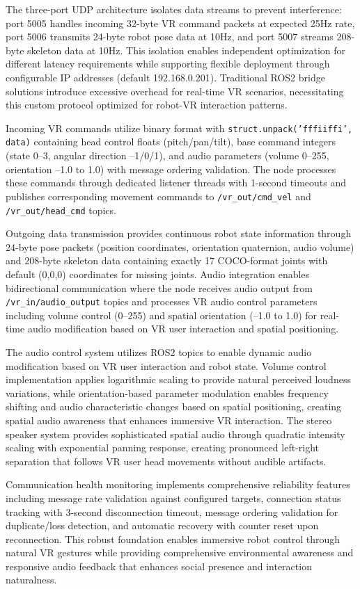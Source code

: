 The three-port UDP architecture isolates data streams to prevent interference: port 5005 handles incoming 32-byte VR command packets at expected 25Hz rate, port 5006 transmits 24-byte robot pose data at 10Hz, and port 5007 streams 208-byte skeleton data at 10Hz. This isolation enables independent optimization for different latency requirements while supporting flexible deployment through configurable IP addresses (default 192.168.0.201). Traditional ROS2 bridge solutions introduce excessive overhead for real-time VR scenarios, necessitating this custom protocol optimized for robot-VR interaction patterns.

Incoming VR commands utilize binary format with \texttt{struct.unpack('fffiiffi', data)} containing head control floats (pitch/pan/tilt), base command integers (state 0--3, angular direction --1/0/1), and audio parameters (volume 0--255, orientation --1.0 to 1.0) with message ordering validation. The node processes these commands through dedicated listener threads with 1-second timeouts and publishes corresponding movement commands to \texttt{/vr\_out/cmd\_vel} and \texttt{/vr\_out/head\_cmd} topics.

Outgoing data transmission provides continuous robot state information through 24-byte pose packets (position coordinates, orientation quaternion, audio volume) and 208-byte skeleton data containing exactly 17 COCO-format joints with default (0,0,0) coordinates for missing joints. Audio integration enables bidirectional communication where the node receives audio output from \texttt{/vr\_in/audio\_output} topics and processes VR audio control parameters including volume control (0--255) and spatial orientation (--1.0 to 1.0) for real-time audio modification based on VR user interaction and spatial positioning.

The audio control system utilizes ROS2 topics to enable dynamic audio modification based on VR user interaction and robot state. Volume control implementation applies logarithmic scaling to provide natural perceived loudness variations, while orientation-based parameter modulation enables frequency shifting and audio characteristic changes based on spatial positioning, creating spatial audio awareness that enhances immersive VR interaction. The stereo speaker system provides sophisticated spatial audio through quadratic intensity scaling with exponential panning response, creating pronounced left-right separation that follows VR user head movements without audible artifacts.

Communication health monitoring implements comprehensive reliability features including message rate validation against configured targets, connection status tracking with 3-second disconnection timeout, message ordering validation for duplicate/loss detection, and automatic recovery with counter reset upon reconnection. This robust foundation enables immersive robot control through natural VR gestures while providing comprehensive environmental awareness and responsive audio feedback that enhances social presence and interaction naturalness.

